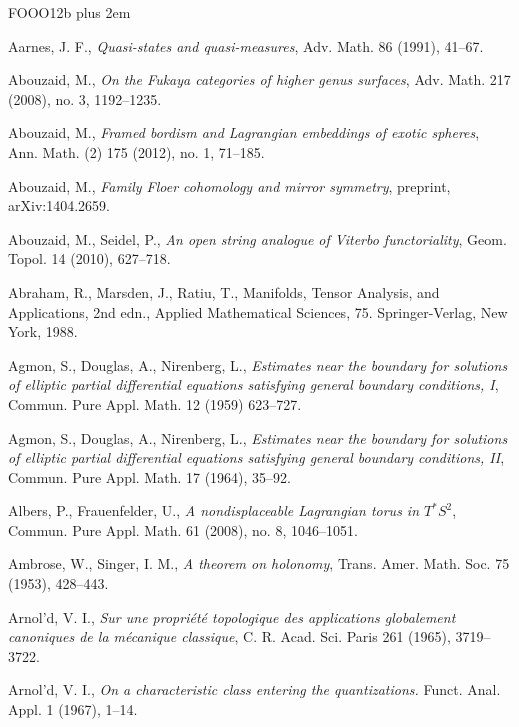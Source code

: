 \begingroup
\def\index#1{}
\begin{thebibliography}{FOOO12b}
\small
\sloppy
\setlength{\emergencystretch}{10em}
\rightskip=0pt plus 2em
\setlength{\itemsep}{0pt}
\setlength{\parsep}{0pt}
{}

 Aarnes, J. F., \emph{Quasi-states and quasi-measures}, Adv. Math. 86 (1991), 41–67.

 Abouzaid, M., \emph{On the Fukaya categories of higher genus surfaces}, Adv. Math.
  217 (2008), no. 3, 1192–1235.

 Abouzaid, M., \emph{Framed bordism and Lagrangian embeddings of exotic spheres},
  Ann. Math. (2) 175 (2012), no. 1, 71–185.

 Abouzaid, M., \emph{Family Floer cohomology and mirror symmetry}, preprint,
  arXiv:1404.2659.

 Abouzaid, M., Seidel, P., \emph{An open string analogue of Viterbo
  functorial\-ity}, Geom. Topol. 14 (2010), 627–718.

 Abraham, R., Marsden, J., Ratiu, T., Manifolds, Tensor Analysis, and Applications,
  2nd edn., Applied Mathematical Sciences, 75. Springer-Verlag, New York, 1988.

 Agmon, S., Douglas, A., Nirenberg, L., \emph{Estimates near the boundary for
  solutions of elliptic partial diﬀerential equations satisfying general boundary conditions, I}, Commun.
  Pure Appl. Math. 12 (1959) 623–727.

 Agmon, S., Douglas, A., Nirenberg, L., \emph{Estimates near the boundary for
  solutions of elliptic partial diﬀerential equations satisfying general boundary conditions, II},
  Commun. Pure Appl. Math. 17 (1964), 35–92.

 Albers, P., Frauenfelder, U., \emph{A nondisplaceable Lagrangian torus in $T^*S^2$},
  Commun. Pure Appl. Math. 61 (2008), no. 8, 1046–1051.

 Ambrose, W., Singer, I. M., \emph{A theorem on holonomy}, Trans. Amer. Math. Soc. 75
  (1953), 428–443.

 Arnol’d, V. I., \emph{Sur une propriété topologique des applications globale\-ment
  canoniques de la mécanique classique}, C. R. Acad. Sci. Paris 261 (1965), 3719–3722.

 Arnol’d, V. I., \emph{On a characteristic class entering the quantizations.} Funct.
  Anal. Appl. 1 (1967), 1–14.


\end{thebibliography}
